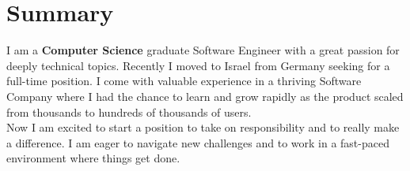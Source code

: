 \documentclass{style/modernsimplecv}
\begin{document}
\bigskip
\begin{minipage}{0.99\textwidth}
\section*{Summary}
    I am a \textbf{Computer Science} graduate Software Engineer with a great passion for deeply technical topics. Recently I moved to Israel from Germany seeking for a full-time position. I come with valuable experience in a thriving Software Company where I had the chance to learn and grow rapidly as the product scaled from thousands to hundreds of thousands of users.\\
    Now I am excited to start a position to take on responsibility and to really make a difference. I am eager to navigate new challenges and to work in a fast-paced environment where things get done.
\end{minipage}
\end{document}
